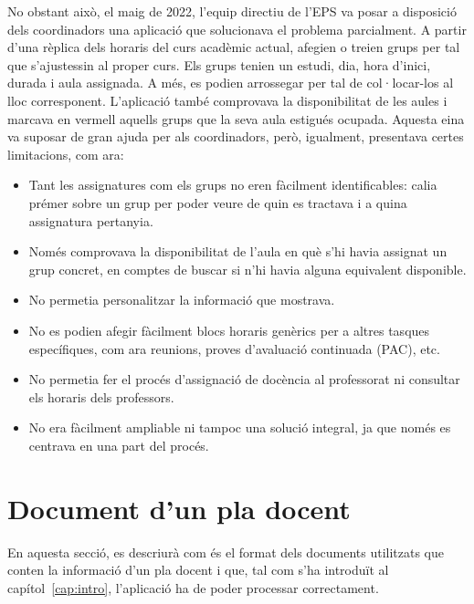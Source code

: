 \documentclass[a4paper,12pt]{ThesisStyle}
\begin{document}
No obstant això, el maig de 2022, l'equip directiu de l'EPS va posar a disposició dels coordinadors una aplicació que solucionava el problema parcialment. A partir d'una rèplica dels horaris del curs acadèmic actual, afegien o treien grups per tal que s'ajustessin al proper curs. Els grups tenien un estudi, dia, hora d'inici, durada i aula assignada. A més, es podien arrossegar per tal de col·locar-los al lloc corresponent. L'aplicació també comprovava la disponibilitat de les aules i marcava en vermell aquells grups que la seva aula estigués ocupada. Aquesta eina va suposar de gran ajuda per als coordinadors, però, igualment, presentava certes limitacions, com ara:
\begin{itemize}
  \item Tant les assignatures com els grups no eren fàcilment identificables: calia prémer sobre un grup per poder veure de quin es tractava i a quina assignatura pertanyia.
  \item Només comprovava la disponibilitat de l'aula en què s'hi havia assignat un grup concret, en comptes de buscar si n'hi havia alguna equivalent disponible.
  \item No permetia personalitzar la informació que mostrava.
  \item No es podien afegir fàcilment blocs horaris genèrics per a altres tasques específiques, com ara reunions, proves d'avaluació continuada (PAC), etc.
  \item No permetia fer el procés d'assignació de docència al professorat ni consultar els horaris dels professors.
  \item No era fàcilment ampliable ni tampoc una solució integral, ja que només es centrava en una part del procés.
\end{itemize}

\section{Document d'un pla docent}
\label{sec:document_pla_docent}

En aquesta secció, es descriurà com és el format dels documents utilitzats que conten la informació d'un pla docent i que, tal com s'ha introduït al capítol~\ref{cap:intro}, l'aplicació ha de poder processar correctament.
\end{document}
